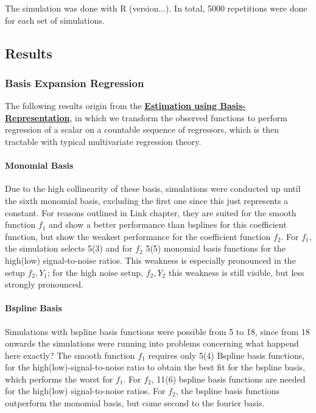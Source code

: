 \documentclass[11pt,twoside,a4paper]{article}
\begin{document}
	
		 The simulation was done with R (version...). In total, 5000 repetitions were done for each set of simulations. 
		
	
	\subsection{Results}	
	
	\subsubsection{Basis Expansion Regression}
	The following results origin from the \hyperref[basis_exp_transf]{\textbf{Estimation using Basis-Representation}}, in which we transform the observed functions to perform regression of a scalar on a countable sequence of regressors, which is then tractable with typical multivariate regression theory. 
	
	\paragraph{Monomial Basis}
	Due to the high collinearity of these basis, simulations were conducted up until the sixth monomial basis, excluding the first one since this just represents a constant. For reasons outlined in {\color{green} Link chapter}, they are suited for the smooth function $f_1$ and show a better performance than bsplines for this coefficient function, but show the weakest performance for the coefficient function $f_2$. For $f_1$, the simulation selects 5(3) and for $f_2$ 5(5) monomial basis functions for the high(low) signal-to-noise ratios. This weakness is especially pronounced in the setup $f_2,Y_1$; for the high noise setup, $f_2, Y_2$ this weakness is still visible, but less strongly pronounced.
	
	\paragraph{Bspline Basis}
	Simulations with bspline basis functions were possible from 5 to 18, since from 18 onwards the simulations were running into problems concerning {\color{green} what happend here exactly?}
The smooth function $f_1$ requires only 5(4) Bspline basis functions, for the high(low)-signal-to-noise ratio to obtain the best fit for the bspline basis, which performs the worst for $f_1$. For $f_2$, 11(6) bspline basis functions are needed for the high(low) signal-to-noise ratios. For $f_2$, the bspline basis functions outperform the monomial basis, but come second to the fourier basis.
	
\end{document}
